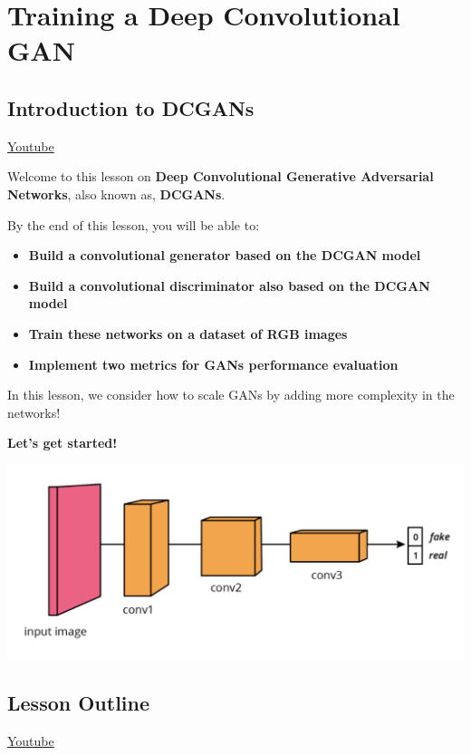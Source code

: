 \chapter{Training a Deep Convolutional GAN}

\section{Introduction to DCGANs}
\href{https://www.youtube.com/watch?v=UX92j4g0W8Q}{Youtube} \newline

Welcome to this lesson on \textbf{Deep Convolutional Generative Adversarial Networks}, also known as, \textbf{DCGANs}.

By the end of this lesson, you will be able to:

\begin{itemize}
    \item \textbf{Build a convolutional generator based on the DCGAN model}
    \item \textbf{Build a convolutional discriminator also based on the DCGAN model}
    \item \textbf{Train these networks on a dataset of RGB images}
    \item \textbf{Implement two metrics for GANs performance evaluation}
\end{itemize}
In this lesson, we consider how to scale GANs by adding more complexity in the networks!

\textbf{Let’s get started!}

\includegraphics[width=1\linewidth]{img//genAdvNet//deepGAN/screen-shot-2022-05-10-at-9.21.49-am.jpeg}

\section{Lesson Outline}
\href{https://www.youtube.com/watch?v=ADv_s4yanOU}{Youtube} \newline


